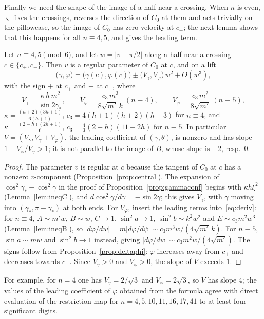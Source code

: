 Finally we need the shape of the image of a half near a crossing. When $n$ is even, $\varsigma$ fixes the crossings,
reverses the direction of $C_0$ at them and acts trivially on the pillowcase, so the image of $C_0$ has zero velocity at
$c_\pm$; the next lemma shows that this happens for all $n\equiv4,5$, and gives the leading term.

\begin{lemma}\label{lem:crossinglocal}
Let $n\equiv4,5\pmod6$, and let $w=|v-\pi/2|$ along a half near a crossing $c\in\{c_+,c_-\}$. Then $v$ is a regular
parameter of $C_0$ at $c$, and on a lift
\[
\bigl(\gamma,\varphi\bigr)=\bigl(\gamma(c),\varphi(c)\bigr)\pm\bigl(V_\gamma,V_\varphi\bigr)\,w^2+O(w^3),
\]
with the sign $+$ at $c_+$ and $-$ at $c_-$, where
\[
V_\gamma=\frac{\kappa\,h\,m^2}{\sin2\gamma_*},\qquad
V_\varphi=\frac{c_3\,m^3}{8\sqrt{m'}\,k}\ (n\equiv4),\qquad V_\varphi=\frac{c_3\,m^2}{8\sqrt{m'}}\ (n\equiv5),
\]
$\kappa=\frac{(h+2)(3h+1)}{6(h+1)}$, $c_3=4(h+1)(h+2)(h+3)$ for $n\equiv4$, and $\kappa=\frac{(2-h)(2h+1)}6$, $c_3=\frac43(2-h)(11-2h)$ for
$n\equiv5$. In particular $V=(V_\gamma,V_\gamma+V_\varphi)$, the leading coefficient of $(\gamma,\theta)$, is nonzero and has slope
$1+V_\varphi/V_\gamma>1$; it is not parallel to the image of $B$, whose slope is $-2$, resp.\ $0$.
\end{lemma}

\begin{proof}
The parameter $v$ is regular at $c$ because the tangent of $C_0$ at $c$ has a nonzero $v$-component
(Proposition~\ref{prop:central}). The expansion of $\cos^2\gamma_*-\cos^2\gamma$ in the proof of Proposition~\ref{prop:gammaconf}
begins with $\kappa h\xi^2$ (Lemma~\ref{lem:ineqC}), and $d\cos^2\gamma/d\gamma=-\sin2\gamma$; this gives $V_\gamma$, with $\gamma$ moving into
$(\gamma_*,\pi-\gamma_*)$ at both ends. For $V_\varphi$, insert the leading terms into~\eqref{eq:deriv}: for $n\equiv4$, $A\sim m'w$,
$B\sim w$, $C\to1$, $\sin^2a\to1$, $\sin^2b\sim k^2w^2$ and $E\sim c_3m^2w^3$ (Lemma~\ref{lem:ineqB}), so
$|d\varphi/dw|=m|d\varphi/d\psi|\sim c_3m^3w/(4\sqrt{m'}\,k)$. For $n\equiv5$, $\sin a\sim mw$ and $\sin^2b\to1$ instead, giving
$|d\varphi/dw|\sim c_3m^2w/(4\sqrt{m'})$. The signs follow from Proposition~\ref{prop:deltaphi}: $\varphi$ increases away from $c_+$ and
decreases towards $c_-$. Since $V_\gamma>0$ and $V_\varphi>0$, the slope of $V$ exceeds $1$.
\end{proof}

For example, for $n=4$ one has $V_\gamma=2/\sqrt3$ and $V_\varphi=2\sqrt3$, so $V$ has slope $4$; the values of the
leading coefficient of $\varphi$ obtained from the formula agree with direct evaluation of the restriction map for
$n=4,5,10,11,16,17,41$ to at least four significant digits.
